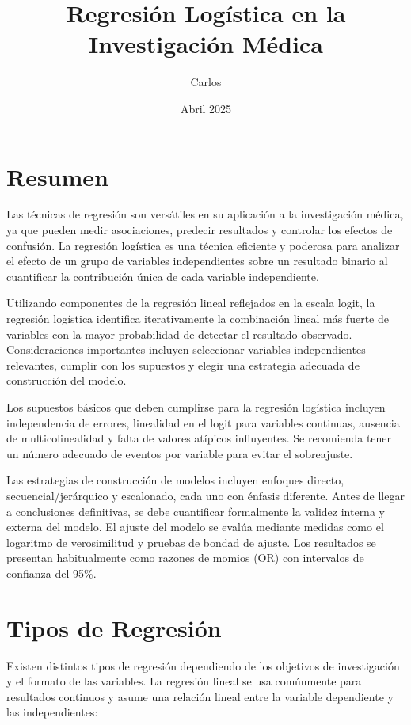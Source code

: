 \documentclass[12pt]{article}
\title{Regresi\'on Log\'istica en la Investigaci\'on M\'edica}
\author{Carlos}
\date{Abril 2025}
\begin{document}
\maketitle


\section{Resumen}

Las técnicas de regresión son versátiles en su aplicación a la investigación médica, ya que pueden medir asociaciones, predecir resultados y controlar los efectos de confusión. La regresión logística es una técnica eficiente y poderosa para analizar el efecto de un grupo de variables independientes sobre un resultado binario al cuantificar la contribución única de cada variable independiente.

Utilizando componentes de la regresión lineal reflejados en la escala logit, la regresión logística identifica iterativamente la combinación lineal más fuerte de variables con la mayor probabilidad de detectar el resultado observado. Consideraciones importantes incluyen seleccionar variables independientes relevantes, cumplir con los supuestos y elegir una estrategia adecuada de construcción del modelo.

Los supuestos básicos que deben cumplirse para la regresión logística incluyen independencia de errores, linealidad en el logit para variables continuas, ausencia de multicolinealidad y falta de valores atípicos influyentes. Se recomienda tener un número adecuado de eventos por variable para evitar el sobreajuste.

Las estrategias de construcción de modelos incluyen enfoques directo, secuencial/jerárquico y escalonado, cada uno con énfasis diferente. Antes de llegar a conclusiones definitivas, se debe cuantificar formalmente la validez interna y externa del modelo. El ajuste del modelo se evalúa mediante medidas como el logaritmo de verosimilitud y pruebas de bondad de ajuste. Los resultados se presentan habitualmente como razones de momios (OR) con intervalos de confianza del 95\%.

\section{Tipos de Regresión}

Existen distintos tipos de regresión dependiendo de los objetivos de investigación y el formato de las variables. La regresión lineal se usa comúnmente para resultados continuos y asume una relación lineal entre la variable dependiente y las independientes:
\end{document}
